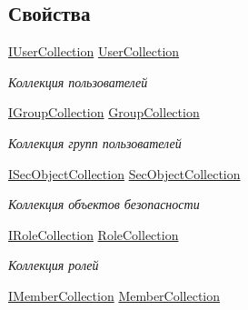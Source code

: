 \subsection*{Свойства}
\begin{DoxyCompactItemize}
\item 
\hyperlink{interface_security_1_1_interfaces_1_1_collections_1_1_i_user_collection}{I\+User\+Collection} \hyperlink{class_security_1_1_core_security_a2cd468b36ea7c64dd98425cb1b221543}{User\+Collection}
\begin{DoxyCompactList}\small\item\em Коллекция пользователей \end{DoxyCompactList}\item 
\hyperlink{interface_security_1_1_interfaces_1_1_collections_1_1_i_group_collection}{I\+Group\+Collection} \hyperlink{class_security_1_1_core_security_ada9f6b2ac17bc46c621bb9acf01aa3ab}{Group\+Collection}
\begin{DoxyCompactList}\small\item\em Коллекция групп пользователей \end{DoxyCompactList}\item 
\hyperlink{interface_security_1_1_interfaces_1_1_collections_1_1_i_sec_object_collection}{I\+Sec\+Object\+Collection} \hyperlink{class_security_1_1_core_security_a02c72cd60218dcbb8866494ee47cac64}{Sec\+Object\+Collection}
\begin{DoxyCompactList}\small\item\em Коллекция объектов безопасности \end{DoxyCompactList}\item 
\hyperlink{interface_security_1_1_interfaces_1_1_collections_1_1_i_role_collection}{I\+Role\+Collection} \hyperlink{class_security_1_1_core_security_a2c7e78fa4c6489ab5b9e7d338986954c}{Role\+Collection}
\begin{DoxyCompactList}\small\item\em Коллекция ролей \end{DoxyCompactList}\item 
\hyperlink{interface_security_1_1_interfaces_1_1_collections_1_1_i_member_collection}{I\+Member\+Collection} \hyperlink{class_security_1_1_core_security_a12a91cfb7b27f3a9fe1d25f7fdebc423}{Member\+Collection}

\end{DoxyCompactItemize}

